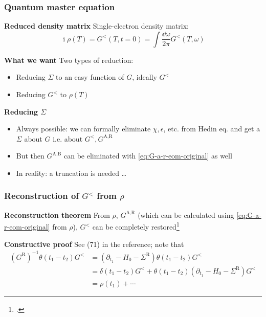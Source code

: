\documentclass[t]{beamer}
\DeclareMathOperator{\ii}{i}
\begin{document}
\begin{frame}
    \frametitle{Quantum master equation}
    
    \textbf{Reduced density  matrix} Single-electron density matrix:
    \begin{equation}
        \ii \rho(T) = G^<(T, t = 0) = \int \frac{\dd{\omega}}{2\pi}  G^<(T, \omega)
    \end{equation}
    
    \vspace{0.25cm}

    \textbf{What we want} Two types of reduction:
    \begin{itemize}
        \item Reducing $\Sigma$ to an easy function of $G$, ideally $G^<$
        \item Reducing $G^<$ to $\rho(T)$
    \end{itemize} 
    
    \vspace{0.25cm}

    \textbf{Reducing $\Sigma$} \begin{itemize}
        \item Always possible: we can formally eliminate $\chi, \epsilon$, etc. from Hedin eq. 
            and get a $\Sigma$ about $G$ i.e. about $G^<, G^{\text{A}, \text{R}}$
        \item But then $G^{\text{A}, \text{B}}$ can be eliminated with \eqref{eq:G-a-r-eom-original} as well
        \item In reality: a truncation is needed \dots
    \end{itemize}

\end{frame}

\begin{frame}
\frametitle{Reconstruction of $G^<$ from $\rho$}

\textbf{Reconstruction theorem} From $\rho$, $G^{\text{A}, \text{R}}$
(which can be calculated using \eqref{eq:G-a-r-eom-original} from $\rho$),
$G^<$ can be completely restored\footcite{vspivcka2005long} 

\vspace{0.25cm} 

\textbf{Constructive proof} See (71) in the reference;
note that 
\begin{equation}
    \begin{aligned}
        (G^{\text{R}})^{-1} \theta(t_1 - t_2) G^< &= 
        (\partial_{t_1} - H_0 - \Sigma^{\text{R}}) \theta(t_1 - t_2) G^< \\
        &= \delta(t_1 - t_2) G^< 
        + \theta(t_1 - t_2) (\partial_{t_1} - H_0 - \Sigma^{\text{R}}) G^< \\
        &= \rho(t_1) + \cdots
    \end{aligned}
\end{equation}

\end{frame}
\end{document}
